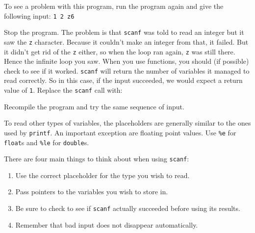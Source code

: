 To see a problem with this program, run the program again and give the following input:
\texttt{1 2 z6}

Stop the program.
The problem is that \texttt{scanf} was told to read an integer but it saw the \texttt{z} character.
Because it couldn't make an integer from that, it failed.
But it didn't get rid of the \texttt{z} either, so when the loop ran again, \texttt{z} was still there.
Hence the infinite loop you saw.
When you use functions, you should (if possible) check to see if it worked.
\texttt{scanf} will return the number of variables it managed to read correctly.
So in this case, if the input succeeded, we would expect a return value of \texttt{1}.
Replace the \texttt{scanf} call with:

Recompile the program and try the same sequence of input.

To read other types of variables, the placeholders are generally similar to the ones used by \texttt{printf}.
An important exception are floating point values.
Use \texttt{\%e} for \texttt{float}s and \texttt{\%le} for \texttt{double}s.


There are four main things to think about when using \texttt{scanf}:
\begin{enumerate}
 \item Use the correct placeholder for the type you wish to read.
 \item Pass pointers to the variables you wish to store in.
 \item Be sure to check to see if \texttt{scanf} actually succeeded
 before using its results.
 \item Remember that bad input does not disappear automatically.
\end{enumerate}
